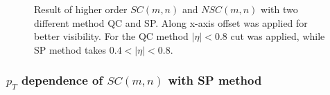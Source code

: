 	\begin{figure}[h]
		\begin{center}
        \caption{Result of higher order $SC(m,n)$ and $NSC(m,n)$ with two different method QC and SP. Along x-axis offset was applied for better visibility. For the QC method $|\eta| < 0.8$ cut was applied, while SP method takes $0.4 < |\eta| <0.8$.}
        \label{SC_higherorder_comparison}
        \end{center}   
     \end{figure}
     
     
\subsubsection{$p_T$ dependence of $SC(m,n)$ with SP method}


